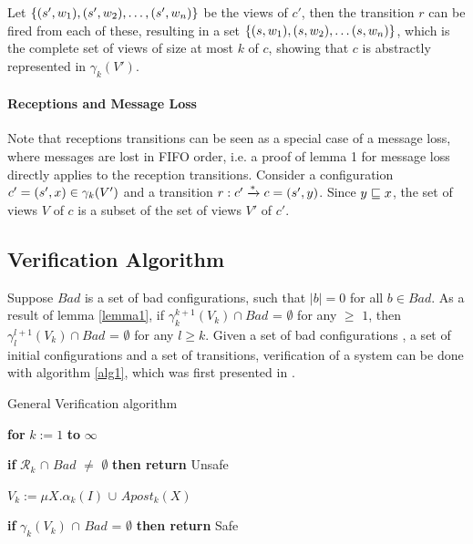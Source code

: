 Let $\{(s', w_1), (s', w_2), \ldots,  (s', w_n)\}$ be the views of $c'$, then the transition $r$ can be fired from each of these, resulting in a set $\{(s, w_1), (s, w_2),\ldots (s, w_n)\}$, which is the complete set of views of size at most $k$ of $c$, showing that $c$ is abstractly represented in $\gamma_k(V')$.

\paragraph{Receptions and Message Loss}
Note that receptions transitions can be seen as a special case of a message loss, where messages are lost in FIFO order, i.e. a proof of lemma 1 for message loss directly applies to the reception transitions. Consider a configuration $c' = (s', x) \in \gamma_k(V')$ and a transition $r: c' \xrightarrow{*} c = (s', y)$. Since $y \sqsubseteq x$, the set of views $V$ of $c$ is a subset of the set of views $V'$ of $c'$.

\subsection{Verification Algorithm}
\label{verificationalgorithm}
Suppose $Bad$ is a set of bad configurations, such that $|b| = 0$ for all $b \in Bad$. As a result of lemma \ref{lemma1}, if $\gamma_k^{k+1}(V_k) \cap Bad$ = $\emptyset$ for any  $\geq$ $1$, then $\gamma_l^{l+1}(V_k) \cap Bad$ = $\emptyset$ for any $l \geq k$. Given a set of bad configurations , a set of initial configurations  and a set of transitions, verification of a system can be done with algorithm \ref{alg1}, which was first presented in \cite{parosh}.

\begin{algorithm}
\begin{algorithmic}[1]
  \caption{General Verification algorithm}
  \label{alg1}
    \State \hspace{8pt}\textbf{for} $k := 1$ \textbf{to} $\infty$

    \State \hspace{16pt}\textbf{if} $\mathcal{R}_k$ $\cap$ $Bad$ $\neq$ $\emptyset$ \textbf{then return} Unsafe

    \State \hspace{16pt}$V_k := \mu X.\alpha_k(I)$ $\cup$ $Apost_k(X)$

    \State \hspace{16pt}\textbf{if} {$\gamma_k(V_k)$ $\cap$ $Bad$ = $\emptyset$} \textbf{then return} Safe
\end{algorithmic}
\end{algorithm}

